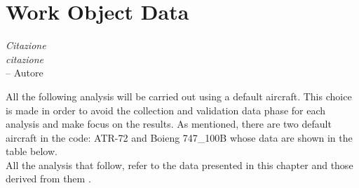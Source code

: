 \chapter{Work Object Data}
\label{ch:workobject}

\begin{flushright}
	{\smaller
		\textit{Citazione\\ citazione}\\
		-- Autore}
\end{flushright}

All the following analysis will be carried out using a default aircraft. This choice is made in order to avoid the collection and validation data phase for each analysis and make focus on the results. As mentioned, there are two default aircraft in the code: ATR-72 and Boieng 747\_100B whose data are shown in the table below.\\
All the analysis that follow, refer to the data presented in this chapter and those derived from them .

